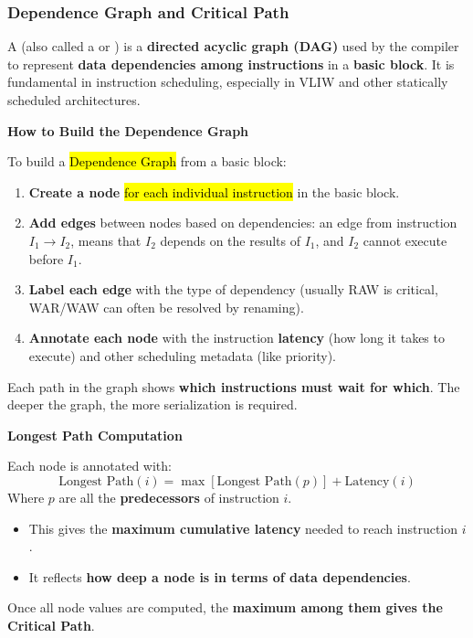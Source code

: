 \subsubsection{Dependence Graph and Critical Path}\label{subsubsection: Dependence Graph and Critical Path}

A  (also called a  or ) is a \textbf{directed acyclic graph (DAG)} used by the compiler to represent \textbf{data dependencies among instructions} in a \textbf{basic block}. It is fundamental in instruction scheduling, especially in VLIW and other statically scheduled architectures.

\highspace
\begin{flushleft}
    \textcolor{Green3}{ \textbf{How to Build the Dependence Graph}}
\end{flushleft}
To build a \hl{Dependence Graph} from a basic block:
\begin{enumerate}
    \item \textbf{Create a node} \hl{for each individual instruction} in the basic block.
    \item \textbf{Add edges} between nodes based on dependencies: an edge from instruction $I_1 \rightarrow I_2$, means that $I_2$ depends on the results of $I_1$, and $I_2$ cannot execute before $I_1$.
    \item \textbf{Label each edge} with the type of dependency (usually RAW is critical, WAR/WAW can often be resolved by renaming).
    \item \textbf{Annotate each node} with the instruction \textbf{latency} (how long it takes to execute) and other scheduling metadata (like priority).
\end{enumerate}
Each path in the graph shows \textbf{which instructions must wait for which}. The deeper the graph, the more serialization is required.

\highspace
\begin{flushleft}
    \textcolor{Green3}{ \textbf{Longest Path Computation}}
\end{flushleft}
Each node is annotated with:
\begin{equation}
    \text{Longest Path}\left(i\right) = \max\left[\text{Longest Path}\left(p\right)\right] + \text{Latency}\left(i\right)    
\end{equation}
Where $p$ are all the \textbf{predecessors} of instruction $i$.
\begin{itemize}
    \item This gives the \textbf{maximum cumulative latency} needed to reach instruction $i$.
    \item It reflects \textbf{how deep a node is in terms of data dependencies}.
\end{itemize}
Once all node values are computed, the \textbf{maximum among them gives the Critical Path}.

